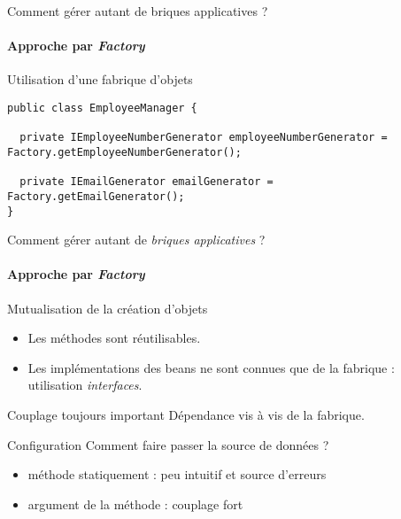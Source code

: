 \begin{frame}[containsverbatim]{Comment gérer autant de briques applicatives ?}
	\framesubtitle{Approche par \emph{Factory}}

	Utilisation d'une fabrique d'objets
	\begin{lstlisting}
public class EmployeeManager {

  private IEmployeeNumberGenerator employeeNumberGenerator = Factory.getEmployeeNumberGenerator();

  private IEmailGenerator emailGenerator = Factory.getEmailGenerator();
}
	\end{lstlisting}


\end{frame}

\begin{frame}{Comment gérer autant de \emph{briques applicatives} ?}
	\framesubtitle{Approche par \emph{Factory}}

	\begin{exampleblock}{Mutualisation de la création d'objets}
	\begin{itemize}[<+->]
	\item Les méthodes sont réutilisables.
	\item Les implémentations des beans ne sont connues que de la fabrique : utilisation \emph{interfaces}.
	\end{itemize}
	\end{exampleblock}

	\pause
	\begin{alertblock}{Couplage toujours important}
	Dépendance vis à vis de la fabrique.
	\end{alertblock}

	\pause
	\begin{alertblock}{Configuration}
	Comment faire passer la source de données ?
	\begin{itemize}[<+->]
	\item méthode statiquement : peu intuitif et source d'erreurs
	\item argument de la méthode : couplage fort
	\end{itemize}
	\end{alertblock}
\end{frame}


